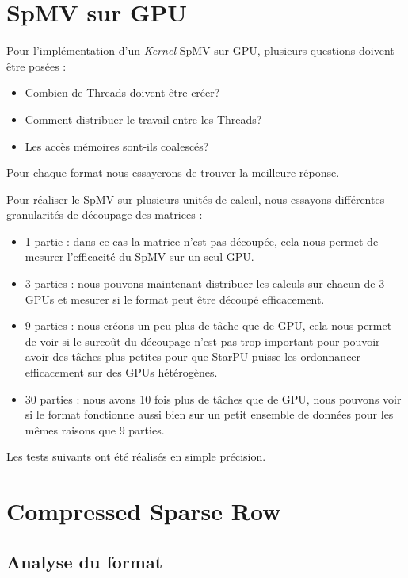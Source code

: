 \documentclass[a4paper,11pt]{report}
\begin{document}
 \section{SpMV sur GPU}
  Pour l'implémentation d'un \textit{Kernel} SpMV sur GPU, plusieurs questions
  doivent être posées :
  \begin{itemize}
   \item Combien de Threads doivent être créer?
   \item Comment distribuer le travail entre les Threads?
   \item Les accès mémoires sont-ils coalescés?
  \end{itemize}
  Pour chaque format nous essayerons de trouver la meilleure réponse.
  
  Pour réaliser le SpMV sur plusieurs unités de calcul, nous essayons
  différentes granularités de découpage des matrices :
  \begin{itemize}
   \item 1 partie : dans ce cas la matrice n'est pas découpée, cela nous
     permet de mesurer l'efficacité du SpMV sur un seul GPU.
   \item 3 parties : nous pouvons maintenant distribuer les calculs sur
     chacun de 3 GPUs et mesurer si le format peut être découpé efficacement.
   \item 9 parties : nous créons un peu plus de tâche que de GPU, cela
     nous permet de voir si le surcoût du découpage n'est pas trop
     important pour pouvoir avoir des tâches plus petites pour que
     StarPU puisse les ordonnancer efficacement sur des GPUs hétérogènes.
   \item 30 parties : nous avons 10 fois plus de tâches que de GPU,
     nous pouvons voir si le format fonctionne aussi bien sur un petit
     ensemble de données pour les mêmes raisons que 9 parties.
  \end{itemize}

  Les tests suivants ont été réalisés en simple précision.

 \section[CSR : Compressed Sparse Row]{Compressed Sparse Row}
  \subsection{Analyse du format}
   
\end{document}
